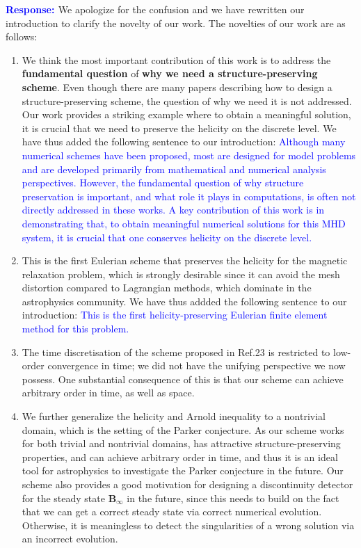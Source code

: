 \documentclass{article}
\theoremstyle{definition}
\newcommand{\rp}{\textbf{\textcolor{blue}{Response: }}}
\newcommand{\blue}[1]{\textcolor{blue}{#1}}
\begin{document}
\begin{enumerate}
\rp We apologize for the confusion and we have rewritten our introduction to clarify the novelty of our work. The novelties of our work are as follows:
    \begin{enumerate}
        \item We think the most important contribution of this work is to address the \textbf{fundamental question} of \textbf{why we need a structure-preserving scheme}. Even though there are many papers describing how to design a structure-preserving scheme, the question of why we need it is not addressed. Our work provides a striking example where to obtain a meaningful solution, it is crucial that we need to preserve the helicity on the discrete level. We have thus added the following sentence to our introduction: \blue{Although many numerical schemes have been proposed, most are designed for model problems and are developed primarily from mathematical and numerical analysis perspectives. However, the fundamental question of why structure preservation is important, and what role it plays in computations, is often not directly addressed in these works. A key contribution of this work is in demonstrating that, to obtain meaningful numerical solutions for this MHD system, it is crucial that one conserves helicity on the discrete level.} 
        \item This is the first Eulerian scheme that preserves the helicity for the magnetic relaxation problem, which is strongly desirable since it can avoid the mesh distortion compared to Lagrangian methods, which dominate in the astrophysics community. We have thus addded the following sentence to our introduction: \blue{This is the first helicity-preserving Eulerian finite element method for this problem.}
        \item The time discretisation of the scheme proposed in Ref.23 is restricted to low-order convergence in time; we did not have the unifying perspective we now possess. One substantial consequence of this is that our scheme can achieve arbitrary order in time, as well as space.  
        \item We further generalize the helicity and Arnold inequality to a nontrivial domain, which is the setting of the Parker conjecture. As our scheme works for both trivial and nontrivial domains, has attractive structure-preserving properties, and can achieve arbitrary order in time, and thus it is an ideal tool for astrophysics to investigate the Parker conjecture in the future. Our scheme also provides a good motivation for designing a discontinuity detector for the steady state $\bm B_{\infty}$ in the future, since this needs to build on the fact that we can get a correct steady state via correct numerical evolution. Otherwise, it is meaningless to detect the singularities of a wrong solution via an incorrect evolution. 

\end{enumerate}
\end{enumerate}
\end{document}
